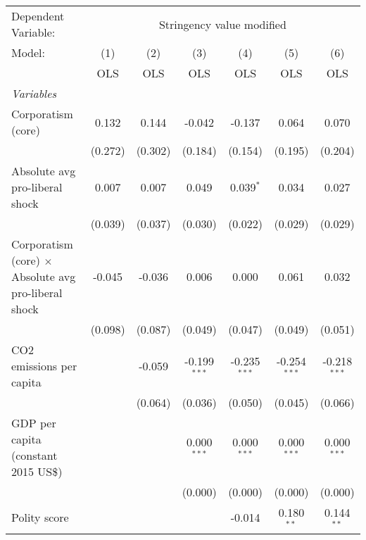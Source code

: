 
\begingroup
\centering
\begin{tabular}{lcccccc}
   \toprule
   Dependent Variable: & \multicolumn{6}{c}{Stringency value modified}\\
   Model:                                                      & (1)     & (2)     & (3)            & (4)            & (5)            & (6)\\  
                                                               &  OLS    & OLS     & OLS            & OLS            & OLS            & OLS\\  
   \midrule
   \emph{Variables}\\
   Corporatism (core)                                          & 0.132   & 0.144   & -0.042         & -0.137         & 0.064          & 0.070\\   
                                                               & (0.272) & (0.302) & (0.184)        & (0.154)        & (0.195)        & (0.204)\\   
   Absolute avg pro-liberal shock                              & 0.007   & 0.007   & 0.049          & 0.039$^{*}$    & 0.034          & 0.027\\   
                                                               & (0.039) & (0.037) & (0.030)        & (0.022)        & (0.029)        & (0.029)\\   
   Corporatism (core) $\times$ Absolute avg pro-liberal shock  & -0.045  & -0.036  & 0.006          & 0.000          & 0.061          & 0.032\\   
                                                               & (0.098) & (0.087) & (0.049)        & (0.047)        & (0.049)        & (0.051)\\   
   CO2 emissions per capita                                    &         & -0.059  & -0.199$^{***}$ & -0.235$^{***}$ & -0.254$^{***}$ & -0.218$^{***}$\\   
                                                               &         & (0.064) & (0.036)        & (0.050)        & (0.045)        & (0.066)\\   
   GDP per capita (constant 2015 US\$)                         &         &         & 0.000$^{***}$  & 0.000$^{***}$  & 0.000$^{***}$  & 0.000$^{***}$\\   
                                                               &         &         & (0.000)        & (0.000)        & (0.000)        & (0.000)\\   
   Polity score                                                &         &         &                & -0.014         & 0.180$^{**}$   & 0.144$^{**}$\\   

\end{tabular}
